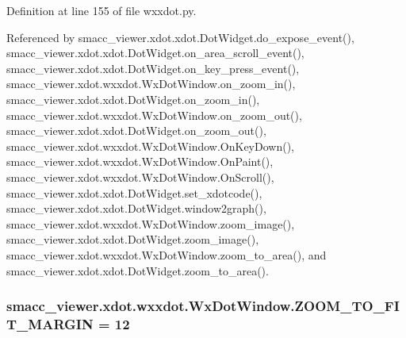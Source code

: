 Definition at line 155 of file wxxdot.\+py.



Referenced by smacc\+\_\+viewer.\+xdot.\+xdot.\+Dot\+Widget.\+do\+\_\+expose\+\_\+event(), smacc\+\_\+viewer.\+xdot.\+xdot.\+Dot\+Widget.\+on\+\_\+area\+\_\+scroll\+\_\+event(), smacc\+\_\+viewer.\+xdot.\+xdot.\+Dot\+Widget.\+on\+\_\+key\+\_\+press\+\_\+event(), smacc\+\_\+viewer.\+xdot.\+wxxdot.\+Wx\+Dot\+Window.\+on\+\_\+zoom\+\_\+in(), smacc\+\_\+viewer.\+xdot.\+xdot.\+Dot\+Widget.\+on\+\_\+zoom\+\_\+in(), smacc\+\_\+viewer.\+xdot.\+wxxdot.\+Wx\+Dot\+Window.\+on\+\_\+zoom\+\_\+out(), smacc\+\_\+viewer.\+xdot.\+xdot.\+Dot\+Widget.\+on\+\_\+zoom\+\_\+out(), smacc\+\_\+viewer.\+xdot.\+wxxdot.\+Wx\+Dot\+Window.\+On\+Key\+Down(), smacc\+\_\+viewer.\+xdot.\+wxxdot.\+Wx\+Dot\+Window.\+On\+Paint(), smacc\+\_\+viewer.\+xdot.\+wxxdot.\+Wx\+Dot\+Window.\+On\+Scroll(), smacc\+\_\+viewer.\+xdot.\+xdot.\+Dot\+Widget.\+set\+\_\+xdotcode(), smacc\+\_\+viewer.\+xdot.\+xdot.\+Dot\+Widget.\+window2graph(), smacc\+\_\+viewer.\+xdot.\+wxxdot.\+Wx\+Dot\+Window.\+zoom\+\_\+image(), smacc\+\_\+viewer.\+xdot.\+xdot.\+Dot\+Widget.\+zoom\+\_\+image(), smacc\+\_\+viewer.\+xdot.\+wxxdot.\+Wx\+Dot\+Window.\+zoom\+\_\+to\+\_\+area(), and smacc\+\_\+viewer.\+xdot.\+xdot.\+Dot\+Widget.\+zoom\+\_\+to\+\_\+area().

\subsubsection[{\texorpdfstring{Z\+O\+O\+M\+\_\+\+T\+O\+\_\+\+F\+I\+T\+\_\+\+M\+A\+R\+G\+IN}{ZOOM_TO_FIT_MARGIN}}]{ smacc\+\_\+viewer.\+xdot.\+wxxdot.\+Wx\+Dot\+Window.\+Z\+O\+O\+M\+\_\+\+T\+O\+\_\+\+F\+I\+T\+\_\+\+M\+A\+R\+G\+IN = 12\hspace{0.3cm}{\ttfamily [static]}}\hypertarget{classsmacc__viewer_1_1xdot_1_1wxxdot_1_1WxDotWindow_af9687848f34831a999813841652a08ae}{}\label{classsmacc__viewer_1_1xdot_1_1wxxdot_1_1WxDotWindow_af9687848f34831a999813841652a08ae}


